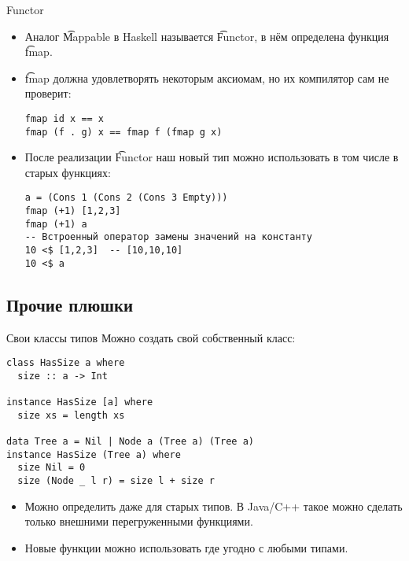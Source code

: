 \begin{frame}[fragile]{Functor}
	\begin{itemize}
		\item Аналог \t{Mappable} в Haskell называется \t{Functor}, в нём определена функция \t{fmap}.
		\item \t{fmap} должна удовлетворять некоторым аксиомам, но их компилятор сам не проверит:
\begin{verbatim}
fmap id x == x
fmap (f . g) x == fmap f (fmap g x)
\end{verbatim}
		\item После реализации \t{Functor} наш новый тип можно использовать в том числе в старых функциях:
\begin{verbatim}
a = (Cons 1 (Cons 2 (Cons 3 Empty)))
fmap (+1) [1,2,3]
fmap (+1) a
-- Встроенный оператор замены значений на константу
10 <$ [1,2,3]  -- [10,10,10]
10 <$ a
\end{verbatim}
	\end{itemize}
\end{frame}

\subsection{Прочие плюшки}
\begin{frame}[fragile]{Свои классы типов}
	Можно создать свой собственный класс:
\begin{verbatim}
class HasSize a where
  size :: a -> Int

instance HasSize [a] where
  size xs = length xs

data Tree a = Nil | Node a (Tree a) (Tree a)
instance HasSize (Tree a) where
  size Nil = 0
  size (Node _ l r) = size l + size r
\end{verbatim}
	\begin{itemize}
		\item
			Можно определить даже для старых типов.
			В Java/C++ такое можно сделать только внешними перегруженными функциями.
		\item Новые функции можно использовать где угодно с любыми типами.
	\end{itemize}
\end{frame}

